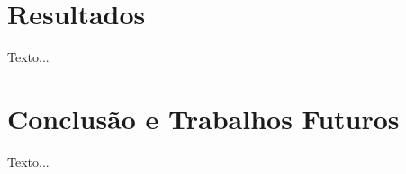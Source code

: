 \documentclass[a4paper, 12pt, oneside]{book}
\begin{document}
\chapter{Resultados}
\thispagestyle{empty} 

Texto...

\chapter{Conclusão e Trabalhos Futuros}
\thispagestyle{empty} 

Texto...
\cite{mermin}
\cite{qutip.org}
\cite{test2}
\cite{davyw}
\cite{quirk}
\cite{simulatorList}



\end{document}
